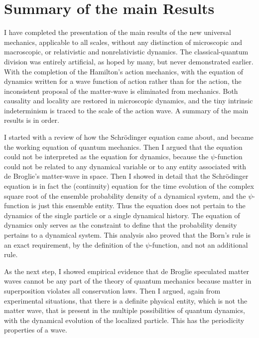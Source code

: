 \section{Summary of the main Results}%


I have completed the presentation of the main results of the new universal mechanics,
applicable to all scales, without any distinction of microscopic and macroscopic, or relativistic and nonrelativistic dynamics. The classical-quantum division was entirely artificial, as hoped by many, but never demonstrated earlier. With the completion of the Hamilton's action mechanics, with the equation of dynamics written for a wave function of action rather than for the action, the inconsistent proposal of the matter-wave is eliminated from mechanics. Both causality and locality are restored in microscopic dynamics, and the tiny intrinsic indeterminism is traced to the scale of the action wave. A summary of the main results is in order.

I started with a review of how the Schr\"{o}dinger equation came about, and became the
working equation of quantum mechanics. Then I argued that the equation could not be
interpreted as the equation for dynamics, because the $\psi$-function could not be related to
any dynamical variable or to any entity associated with de Broglie's matter-wave in space.
Then I showed in detail that the Schr\"{o}dinger equation is in fact the (continuity) equation
for the time evolution of the complex square root of the ensemble probability density of a
dynamical system, and the $\psi$-function is just this ensemble entity. Thus the equation does
not pertain to the dynamics of the single particle or a single dynamical history. The equation
of dynamics only serves as the constraint to define that the probability density pertains to
a dynamical system. This analysis also proved that the Born's rule is an exact requirement,
by the definition of the $\psi$-function, and not an additional rule.

As the next step, I showed empirical evidence that de Broglie speculated matter waves
cannot be any part of the theory of quantum mechanics because matter in superposition
violates all conservation laws. Then I argued, again from experimental situations, that there
is a definite physical entity, which is not the matter wave, that is present in the multiple
possibilities of quantum dynamics, with the dynamical evolution of the localized particle. This has the periodicity properties of a wave.

